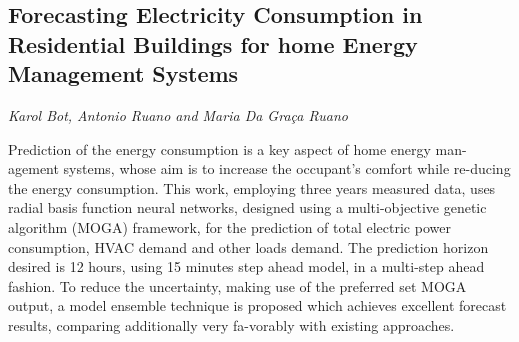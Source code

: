 \documentclass[../booklet.tex]{subfiles}
\begin{document}
\subsection[Forecasting Electricity Consumption in Residential Buildings for home Energy Management Systems. {\it Karol Bot, Antonio Ruano and Maria Da Graça Ruano}]{Forecasting Electricity Consumption in Residential Buildings for home Energy Management Systems}
  

\begin{center}
  {\it Karol Bot, Antonio Ruano and Maria Da Graça Ruano}
\end{center}


Prediction of the energy consumption is a key aspect of home energy man-agement systems, whose aim is to increase the occupant's comfort while re-ducing the energy consumption. This work, employing three years measured data, uses radial basis function neural networks, designed using a multi-objective genetic algorithm (MOGA) framework, for the prediction of total electric power consumption, HVAC demand and other loads demand. The prediction horizon desired is 12 hours, using 15 minutes step ahead model, in a multi-step ahead fashion. To reduce the uncertainty, making use of the preferred set MOGA output, a model ensemble technique is proposed which achieves excellent forecast results, comparing additionally very fa-vorably with existing approaches.
\end{document}
